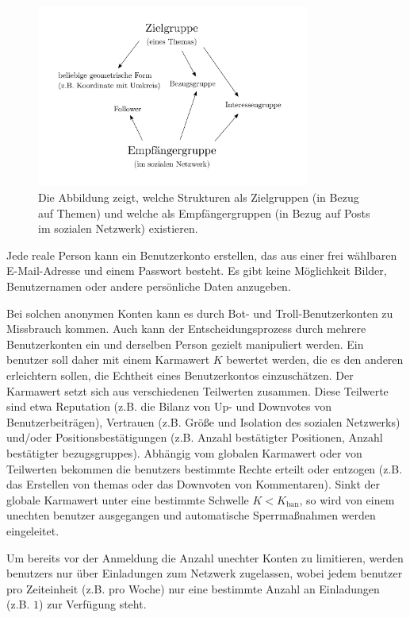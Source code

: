 \documentclass[10pt]{article}
\begin{document}
\begin{figure}[!t]
	\centering
	\includegraphics[width=0.8\textwidth]{zielgruppen_empfaengergruppen.pdf}
	\caption{Die Abbildung zeigt, welche Strukturen als Zielgruppen (in Bezug auf Themen) und welche als Empfängergruppen (in Bezug auf Posts im sozialen Netzwerk) existieren.}
	\label{fig.zielgruppen_empfaengergruppen}
\end{figure}

Jede reale Person kann ein Benutzerkonto erstellen, das aus einer frei wählbaren E-Mail-Adresse und einem Passwort besteht. Es gibt keine Möglichkeit Bilder, Benutzernamen oder andere persönliche Daten anzugeben.

Bei solchen anonymen Konten kann es durch Bot- und Troll-Benutzerkonten zu Missbrauch kommen. Auch kann der Entscheidungsprozess durch mehrere Benutzerkonten ein und derselben Person gezielt manipuliert werden. Ein \gls{benutzer} soll daher mit einem Karmawert $K$ bewertet werden, die es den anderen  erleichtern sollen, die Echtheit eines Benutzerkontos einzuschätzen. Der Karmawert setzt sich aus verschiedenen Teilwerten zusammen. Diese Teilwerte sind etwa Reputation (z.B. die Bilanz von Up- und Downvotes von Benutzerbeiträgen), Vertrauen (z.B. Größe und Isolation des sozialen Netzwerks) und/oder Positionsbestätigungen (z.B. Anzahl bestätigter Positionen, Anzahl bestätigter \glspl{bezugsgruppe}). Abhängig vom globalen Karmawert oder von Teilwerten bekommen die \glspl{benutzer} bestimmte Rechte erteilt oder entzogen (z.B. das Erstellen von \glspl{thema} oder das Downvoten von Kommentaren). Sinkt der globale Karmawert unter eine bestimmte Schwelle $K<K_\text{ban}$, so wird von einem unechten \gls{benutzer} ausgegangen und automatische Sperrmaßnahmen werden eingeleitet.

Um bereits vor der Anmeldung die Anzahl unechter Konten zu limitieren, werden \glspl{benutzer} nur über Einladungen zum Netzwerk zugelassen, wobei jedem \gls{benutzer} pro Zeiteinheit (z.B. pro Woche) nur eine bestimmte Anzahl an Einladungen (z.B. $1$) zur Verfügung steht.
\end{document}
